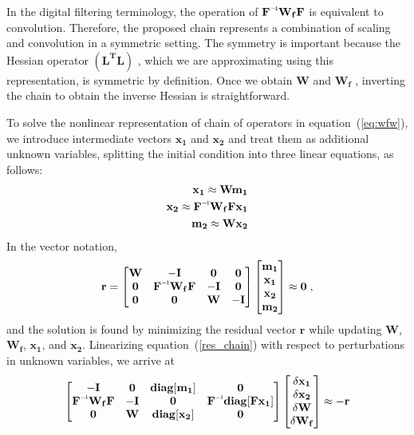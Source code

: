  In the digital filtering terminology, the operation of $\mathbf{\inv{F}W_{f}F}$ is equivalent to convolution. Therefore, the proposed chain represents a combination of scaling and convolution in a symmetric setting. The symmetry is important because the Hessian operator $\mathbf{(L^T L)}$ , which we are approximating using this representation, is symmetric by definition. Once we obtain $\mathbf{W} $ and $ \mathbf{W_f }$ , inverting the chain to obtain the inverse Hessian is straightforward.
 
To solve the nonlinear representation of chain of operators in equation~(\ref{eq:wfw}), we introduce intermediate vectors $\mathbf{x_1}$ and $\mathbf{x_2}$ and treat them as additional unknown variables, splitting the initial condition into three linear equations, as follows:
\begin{equation}
\begin{split}
\mathbf{x_1 \approx Wm_{1}} \\
\mathbf{x_2 \approx \inv{F}W_{f}Fx_1}\\
\mathbf{m_{2} \approx Wx_2 } \\
\end{split}
\label{relax}
\end{equation}
In the vector notation,
\begin{equation}
\mathbf{r}= 
\begin{bmatrix}
\mathbf{W} & \mathbf{-I} & \mathbf{0} & \mathbf{0}\\
\mathbf{0} & \mathbf{\inv{F}W_{f}} \mathbf{F} & \mathbf{-I} & \mathbf{0}\\
\mathbf{0} & \mathbf{0} & \mathbf{W}  & \mathbf{-I}
\end{bmatrix}
\begin{bmatrix}
\mathbf{m_1} \\
\mathbf{x_1} \\
\mathbf{x_2} \\
\mathbf{m_2}
\end{bmatrix}
\approx \mathbf{0} \;,
\label{res_chain}
\end{equation}
and the solution is found by minimizing the residual vector $\mathbf{r}$ while updating $\mathbf{W}$, $\mathbf{W_f}$, $\mathbf{x_1}$, and $\mathbf{x_2}$. Linearizing equation~(\ref{res_chain}) with respect to perturbations in unknown variables, we arrive at
\begin{equation}
\begin{bmatrix}
\mathbf{-I} & \mathbf{0} & \mathbf{diag[m_1]} & \mathbf{0}\\
\mathbf{\inv{F}W_{f}F} & \mathbf{-I} & \mathbf{0} & \mathbf{\inv{F}diag[Fx_1]}\\
\mathbf{0} & \mathbf{W} & \mathbf{diag[x_2]}  & \mathbf{0}
\end{bmatrix}
\begin{bmatrix}
\mathbf{\delta x_1} \\
\mathbf{\delta x_2} \\
\mathbf{\delta W} \\
\mathbf{\delta W_f}
\end{bmatrix}
\approx \mathbf{-r} 
\label{linearized_chain}
\end{equation}
